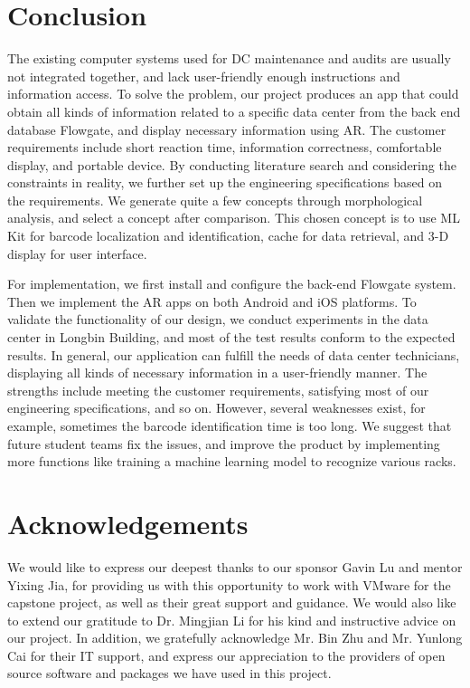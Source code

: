 \documentclass[11pt,a4paper]{article}
\begin{document}
\begin{onehalfspace}
\section{Conclusion}
The existing computer systems used for DC maintenance and audits are usually not integrated together, and lack user-friendly enough instructions and information access. To solve the problem, our project produces an app that could obtain all kinds of information related to a specific data center from the back end database Flowgate, and display necessary information using AR. The customer requirements include short reaction time, information correctness, comfortable display, and portable device. By conducting literature search and considering the constraints in reality, we further set up the engineering specifications based on the requirements. We generate quite a few concepts through morphological analysis, and select a concept after comparison. This chosen concept is to use ML Kit for barcode localization and identification, cache for data retrieval, and 3-D display for user interface.

For implementation, we first install and configure the back-end Flowgate system. Then we implement the AR apps on both Android and iOS platforms. To validate the functionality of our design, we conduct experiments in the data center in Longbin Building, and most of the test results conform to the expected results. In general, our application can fulfill the needs of data center technicians, displaying all kinds of necessary information in a user-friendly manner. The strengths include meeting the customer requirements, satisfying most of our engineering specifications, and so on. However, several weaknesses exist, for example, sometimes the barcode identification time is too long. We suggest that future student teams fix the issues, and improve the product by implementing more functions like training a machine learning model to recognize various racks.







\section{Acknowledgements}
We would like to express our deepest thanks to our sponsor Gavin Lu and mentor Yixing Jia, for providing us with this opportunity to work with VMware for the capstone project, as well as their great support and guidance. We would also like to extend our gratitude to Dr. Mingjian Li for his kind and instructive advice on our project. In addition, we gratefully acknowledge Mr. Bin Zhu and Mr. Yunlong Cai for their IT support, and express our appreciation to the providers of open source software and packages we have used in this project. 








\end{onehalfspace}
\end{document}
